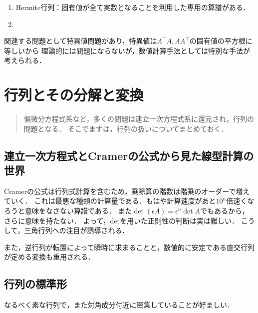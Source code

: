 \documentclass[uplatex, dvipdfmx]{jsreport}
\begin{document}
\begin{enumerate}
    \item Hermite行列：固有値が全て実数となることを利用した専用の算譜がある．
    \item 
\end{enumerate}

関連する問題として特異値問題があり，特異値は$A^\top A,AA^\top$の固有値の平方根に等しいから
理論的には問題にならないが，数値計算手法としては特別な手法が考えられる．

\chapter{行列とその分解と変換}

\begin{quotation}
    偏微分方程式系など，多くの問題は連立一次方程式系に還元され，行列の問題となる．
    そこでまずは，行列の扱いについてまとめておく．
\end{quotation}

\section{連立一次方程式とCramerの公式から見た線型計算の世界}

\begin{tcolorbox}[colframe=ForestGreen, colback=ForestGreen!10!white,breakable,colbacktitle=ForestGreen!40!white,coltitle=black,fonttitle=\bfseries\sffamily,
title=計算量の世界：三角行列への注目]
    Cramerの公式は行列式計算を含むため，乗除算の階数は階乗のオーダーで増えていく．
    これは最悪な種類の計算量である．もはや計算速度があと$10^n$倍速くなろうと意味をなさない算譜である．
    また$\det(\epsilon A)=\epsilon^n\det A$でもあるから，さらに意味を持たない．
    よって，detを用いた正則性の判断は実は難しい．
    こうして，三角行列への注目が誘導される．
\end{tcolorbox}

また，逆行列が転置によって瞬時に求まることと，数値的に安定である直交行列が定める変換も重用される．

\section{行列の標準形}

\begin{tcolorbox}[colframe=ForestGreen, colback=ForestGreen!10!white,breakable,colbacktitle=ForestGreen!40!white,coltitle=black,fonttitle=\bfseries\sffamily,
title=]
    なるべく素な行列で，また対角成分付近に密集していることが好ましい．
\end{tcolorbox}
\end{document}
